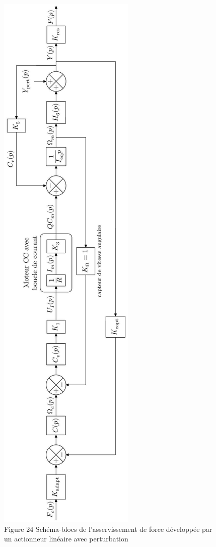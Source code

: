 \documentclass[10pt]{article}
\begin{document}
\begin{figure}[h]
\begin{center}
  \includegraphics[width=\textwidth]{2025_09_16_5f2d7643f7e649c6833dg-16}
\captionsetup{labelformat=empty}
\caption{Figure 24 Schéma-blocs de l'asservissement de force développée par un actionneur linéaire avec perturbation}
\end{center}
\end{figure}
\end{document}
